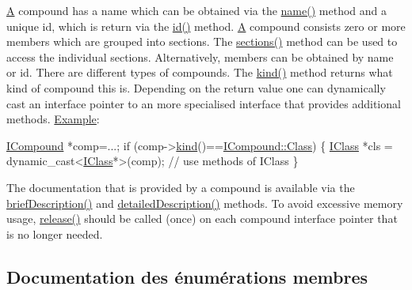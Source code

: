 \hyperlink{class_a}{A} compound has a name which can be obtained via the \hyperlink{class_i_compound_aaba330144c2c9d424505765f2ff94195}{name()} method and a unique id, which is return via the \hyperlink{class_i_compound_adcf419960af1fe868da64bc7481714fb}{id()} method. \hyperlink{class_a}{A} compound consists zero or more members which are grouped into sections. The \hyperlink{class_i_compound_aa94295e3ba675c026da25565a5e619da}{sections()} method can be used to access the individual sections. Alternatively, members can be obtained by name or id. There are different types of compounds. The \hyperlink{class_i_compound_a0fa87b43812418e64a0a82d64a6cc57f}{kind()} method returns what kind of compound this is. Depending on the return value one can dynamically cast an interface pointer to an more specialised interface that provides additional methods. \hyperlink{struct_example}{Example}\+: 
\begin{DoxyCode}
\hyperlink{class_i_compound}{ICompound} *comp=...;
\textcolor{keywordflow}{if} (comp->\hyperlink{class_i_compound_a0fa87b43812418e64a0a82d64a6cc57f}{kind}()==\hyperlink{class_i_compound_a6b86be2ca9f6759434c1dd8405be328aa46e72a174dcbe81fd0c69edf69d11c12}{ICompound::Class})
\{
  \hyperlink{class_i_class}{IClass} *cls = \textcolor{keyword}{dynamic\_cast<}\hyperlink{class_i_class}{IClass}*\textcolor{keyword}{>}(comp);
  \textcolor{comment}{// use methods of IClass}
\}
\end{DoxyCode}
 The documentation that is provided by a compound is available via the \hyperlink{class_i_compound_aff3daafa3d304da9730fd9b58d8160b1}{brief\+Description()} and \hyperlink{class_i_compound_a276eb18a53d20f9d2211a66df8eb7703}{detailed\+Description()} methods. To avoid excessive memory usage, \hyperlink{class_i_compound_a5388c74d390323ce610f752a01456b21}{release()} should be called (once) on each compound interface pointer that is no longer needed. 

\subsection{Documentation des énumérations membres}
\hypertarget{class_i_compound_a6b86be2ca9f6759434c1dd8405be328a}{}
